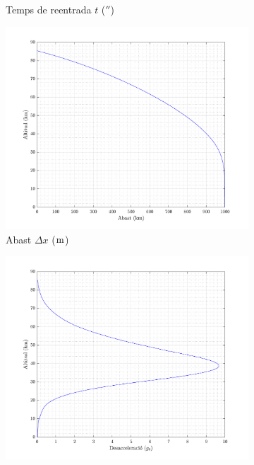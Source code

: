 \begin{figure}[ht]
\begin{subfigure}{.37\textwidth}
        \caption{Temps de reentrada $t$ ($\second$)}
    \end{subfigure}
        \begin{subfigure}{.37\textwidth}
        \centering
        \includegraphics[width=\linewidth]{imagenes/09_mercury_graficas/abast_no_title.pdf}
        \caption{Abast $\Delta x$ ($\meter$)}
    \end{subfigure}%
    \begin{subfigure}{.37\textwidth}
        \centering
        \includegraphics[width=\linewidth]{imagenes/09_mercury_graficas/desacceleracio_no_title.pdf}

\end{subfigure}
\end{figure}
